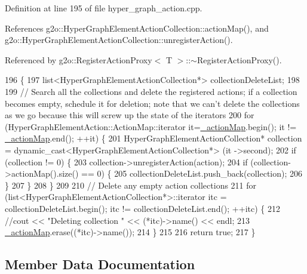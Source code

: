 Definition at line 195 of file hyper\+\_\+graph\+\_\+action.\+cpp.



References g2o\+::\+Hyper\+Graph\+Element\+Action\+Collection\+::action\+Map(), and g2o\+::\+Hyper\+Graph\+Element\+Action\+Collection\+::unregister\+Action().



Referenced by g2o\+::\+Register\+Action\+Proxy$<$ T $>$\+::$\sim$\+Register\+Action\+Proxy().


\begin{DoxyCode}
196   \{
197     list<HyperGraphElementActionCollection*> collectionDeleteList;
198 
199     \textcolor{comment}{// Search all the collections and delete the registered actions; if a collection becomes empty,
       schedule it for deletion; note that we can't delete the collections as we go because this will screw up the state
       of the iterators}
200     \textcolor{keywordflow}{for} (HyperGraphElementAction::ActionMap::iterator it=\hyperlink{classg2o_1_1HyperGraphActionLibrary_afc9e9b39a743700dcfc896b50d176b3b}{\_actionMap}.begin(); it != 
      \hyperlink{classg2o_1_1HyperGraphActionLibrary_afc9e9b39a743700dcfc896b50d176b3b}{\_actionMap}.end(); ++it) \{
201       HyperGraphElementActionCollection* collection = \textcolor{keyword}{dynamic\_cast<}HyperGraphElementActionCollection*\textcolor{keyword}{>} (it
      ->second);
202       \textcolor{keywordflow}{if} (collection != 0) \{
203         collection->unregisterAction(action);
204         \textcolor{keywordflow}{if} (collection->actionMap().size() == 0) \{
205           collectionDeleteList.push\_back(collection);
206         \}
207       \}
208     \}
209 
210     \textcolor{comment}{// Delete any empty action collections}
211     \textcolor{keywordflow}{for} (list<HyperGraphElementActionCollection*>::iterator itc = collectionDeleteList.begin(); itc != 
      collectionDeleteList.end(); ++itc) \{
212       \textcolor{comment}{//cout << "Deleting collection " << (*itc)->name() << endl;}
213       \hyperlink{classg2o_1_1HyperGraphActionLibrary_afc9e9b39a743700dcfc896b50d176b3b}{\_actionMap}.erase((*itc)->name());
214     \}
215 
216     \textcolor{keywordflow}{return} \textcolor{keyword}{true};
217   \}
\end{DoxyCode}


\subsection{Member Data Documentation}
